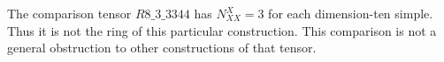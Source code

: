 \begin{remark}
The comparison tensor $R8\_3\_3344$ has
$N_{XX}^{X}=3$ for each dimension-ten simple. Thus it is not the
ring of this particular construction. This comparison is not a
general obstruction to other constructions of that tensor.
\end{remark}
